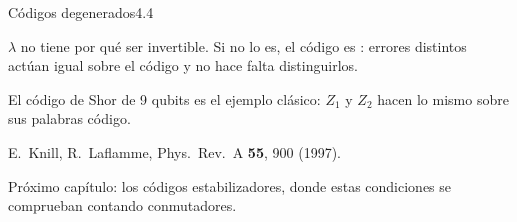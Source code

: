 \documentclass[12pt]{beamer}
\begin{document}
\begin{frame}{Códigos degenerados}{4.4}
\begin{notebox}[Observación 4.4]
$\lambda$ no tiene por qué ser invertible. Si no lo es, el código es
: errores distintos actúan igual sobre el código y no hace
falta distinguirlos.
\end{notebox}
El código de Shor de 9 qubits es el ejemplo clásico: $Z_1$ y $Z_2$ hacen
lo mismo sobre sus palabras código.
\vfill
{\footnotesize\color{igMuted}E.~Knill, R.~Laflamme, Phys.\ Rev.\ A \textbf{55}, 900 (1997).\par}
\end{frame}

  {Próximo capítulo: los códigos estabilizadores, donde estas condiciones
   se comprueban contando conmutadores.}
\end{document}

